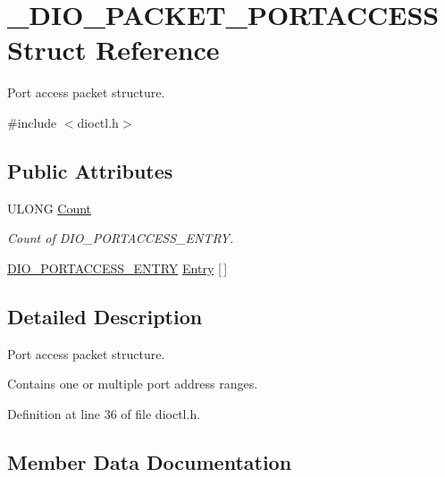 \hypertarget{struct___d_i_o___p_a_c_k_e_t___p_o_r_t_a_c_c_e_s_s}{}\section{\+\_\+\+D\+I\+O\+\_\+\+P\+A\+C\+K\+E\+T\+\_\+\+P\+O\+R\+T\+A\+C\+C\+E\+SS Struct Reference}
\label{struct___d_i_o___p_a_c_k_e_t___p_o_r_t_a_c_c_e_s_s}


Port access packet structure.  




{\ttfamily \#include $<$dioctl.\+h$>$}

\subsection*{Public Attributes}
\begin{DoxyCompactItemize}
\item 
U\+L\+O\+NG \mbox{\hyperlink{struct___d_i_o___p_a_c_k_e_t___p_o_r_t_a_c_c_e_s_s_aa9ff3bb3357668a7e759260997902b63}{Count}}
\begin{DoxyCompactList}\small\item\em Count of D\+I\+O\+\_\+\+P\+O\+R\+T\+A\+C\+C\+E\+S\+S\+\_\+\+E\+N\+T\+RY. \end{DoxyCompactList}\item 
\mbox{\hyperlink{dioctl_8h_a2f0c3270029e69f24ab5023d93a1ab84}{D\+I\+O\+\_\+\+P\+O\+R\+T\+A\+C\+C\+E\+S\+S\+\_\+\+E\+N\+T\+RY}} \mbox{\hyperlink{struct___d_i_o___p_a_c_k_e_t___p_o_r_t_a_c_c_e_s_s_a56311f42ddeea6e5e778e2e02f2e1ba4}{Entry}} \mbox{[}$\,$\mbox{]}
\end{DoxyCompactItemize}


\subsection{Detailed Description}
Port access packet structure. 

Contains one or multiple port address ranges.~\newline


Definition at line 36 of file dioctl.\+h.



\subsection{Member Data Documentation}
\mbox{\label{struct___d_i_o___p_a_c_k_e_t___p_o_r_t_a_c_c_e_s_s_aa9ff3bb3357668a7e759260997902b63}} 
